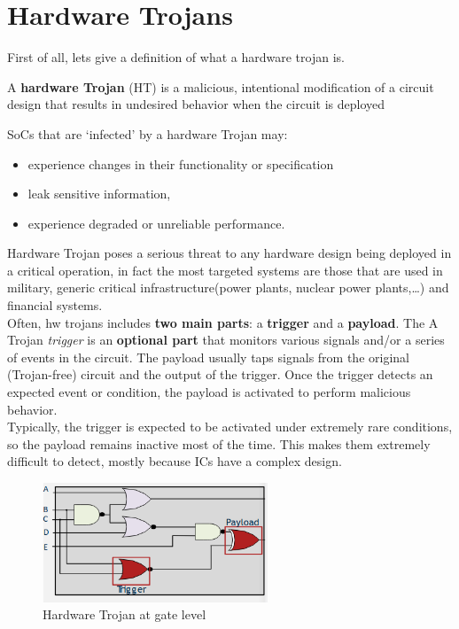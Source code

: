 \chapter{Hardware Trojans}
First of all, lets give a definition of what a hardware trojan is.
\begin{boxH}
  A \textbf{hardware Trojan} (HT) is a malicious, intentional modification of a circuit design that
  results in undesired behavior when the circuit is deployed
\end{boxH}
SoCs that are ‘infected’ by a hardware Trojan may: 
\begin{itemize}
  \item experience changes in their functionality or specification 
  \item leak sensitive information,
  \item experience degraded or unreliable performance.
\end{itemize}
Hardware Trojan poses a serious threat to any hardware design being deployed in a critical
operation, in fact the most targeted systems are those that are used in military, generic critical
infrastructure(power plants, nuclear power plants,\dots) and financial systems.\\

Often, hw trojans includes \textbf{two main parts}: a \textbf{trigger} and a \textbf{payload}. The
A Trojan \textit{trigger} is an \textbf{optional part} that monitors various signals and/or a series
of events in the circuit. The payload usually taps signals from the original (Trojan-free) circuit
and the output of the trigger. Once the trigger detects an expected event or condition, the payload
is activated to perform malicious behavior.\\
Typically, the trigger is expected to be activated under extremely rare conditions, so the payload
remains inactive most of the time. This makes them extremely difficult to detect, mostly because ICs
have a complex design.

\begin{figure}[H]
  \centering
  \includegraphics[width=0.6\textwidth]{img/hardware/hw trojan gates.png}
  \caption{Hardware Trojan at gate level}
  \label{fig:hw-trojan-gates}
\end{figure}

